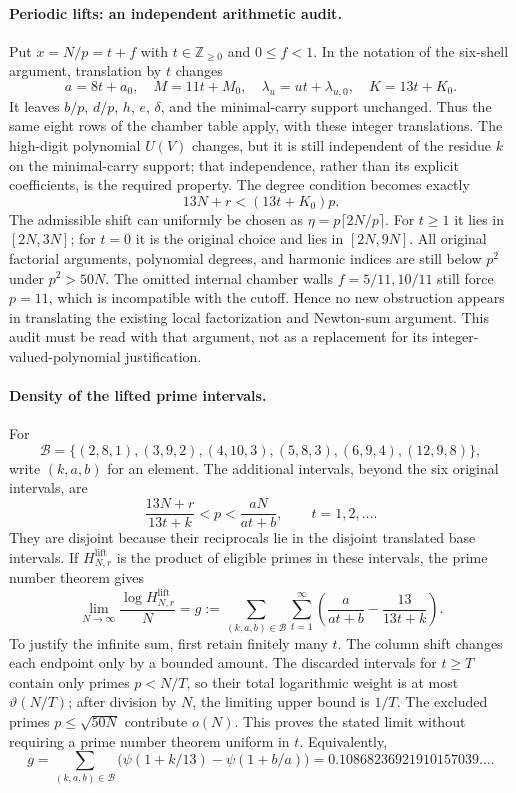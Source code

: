 \paragraph{Periodic lifts: an independent arithmetic audit.}
Put $x=N/p=t+f$ with $t\in\mathbb Z_{\ge0}$ and $0\le f<1$.
In the notation of the six-shell argument, translation by $t$ changes
\[
 a=8t+a_0,\quad M=11t+M_0,\quad
 \lambda_u=ut+\lambda_{u,0},\quad K=13t+K_0.
\]
It leaves $b/p$, $d/p$, $h$, $e$, $\delta$, and the minimal-carry support
unchanged. Thus the same eight rows of the chamber table apply, with these
integer translations. The high-digit polynomial $U(V)$ changes, but it is
still independent of the residue $k$ on the minimal-carry support; that
independence, rather than its explicit coefficients, is the required property.
The degree condition becomes exactly
\[
 13N+r<(13t+K_0)p.
\]
The admissible shift can uniformly be chosen as
$\eta=p\lceil2N/p\rceil$. For $t\ge1$ it lies in $[2N,3N]$;
for $t=0$ it is the original choice and lies in $[2N,9N]$.
All original factorial arguments, polynomial degrees, and harmonic indices
are still below $p^2$ under $p^2>50N$.
The omitted internal chamber walls $f=5/11,10/11$ still force $p=11$,
which is incompatible with the cutoff. Hence no new obstruction appears
in translating the existing local factorization and Newton-sum argument.
This audit must be read with that argument, not as a replacement for its
integer-valued-polynomial justification.

\paragraph{Density of the lifted prime intervals.}
For
\[
 \mathcal B=\{(2,8,1),(3,9,2),(4,10,3),
                 (5,8,3),(6,9,4),(12,9,8)\},
\]
write $(k,a,b)$ for an element. The additional intervals, beyond the six
original intervals, are
\[
 \frac{13N+r}{13t+k}<p<\frac{aN}{at+b},\qquad t=1,2,\ldots .
\]
They are disjoint because their reciprocals lie in the disjoint translated
base intervals. If $H_{N,r}^{\mathrm{lift}}$ is the product of eligible primes
in these intervals, the prime number theorem gives
\[
 \lim_{N\to\infty}\frac{\log H_{N,r}^{\mathrm{lift}}}{N}
 =g:=\sum_{(k,a,b)\in\mathcal B}\sum_{t=1}^{\infty}
       \left(\frac{a}{at+b}-\frac{13}{13t+k}\right).
\]
To justify the infinite sum, first retain finitely many $t$. The column
shift changes each endpoint only by a bounded amount. The discarded
intervals for $t\ge T$ contain only primes $p<N/T$, so their total
logarithmic weight is at most $\vartheta(N/T)$; after division by $N$,
the limiting upper bound is $1/T$. The excluded primes
$p\le\sqrt{50N}$ contribute $o(N)$. This proves the stated limit without
requiring a prime number theorem uniform in $t$.
Equivalently,
\[
 g=\sum_{(k,a,b)\in\mathcal B}
       \bigl(\psi(1+k/13)-\psi(1+b/a)\bigr)
  =0.10868236921910157039\ldots.
\]

